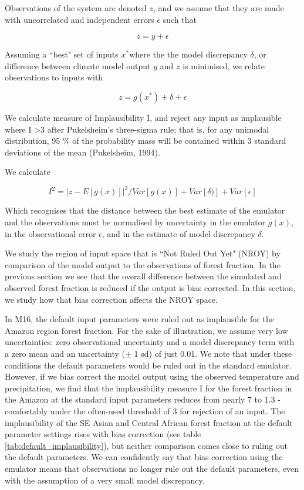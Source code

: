 \documentclass[gmd, manuscript]{copernicus}
\begin{document}
Observations of the system are denoted $z$, and we assume that they are made with uncorrelated and independent errors $\epsilon$  such that

\begin{equation}
z = y+\epsilon
\end{equation}

Assuming a ``best" set of inputs $x^*$where the the model discrepancy $\delta$, or difference between climate model output $y$ and $z$ is minimised, we relate observations to inputs with 

\begin{equation}
z = g(x^*) + \delta + \epsilon 
\end{equation}

We calculate measure of Implausibility I, and reject any input as implausible where I >3 after Pukelsheim's three-sigma rule; that is, for any unimodal distribution, 95 \% of the probability mass will be contained within 3 standard deviations of the mean (Pukelsheim, 1994). 

We calculate

\begin{equation}
I^{2} = {\lvert  z - E[g(x)]\rvert}^{2} /  Var[g(x)] + Var[\delta)] +  Var[\epsilon]
\end{equation}

Which recognises that the distance between the best estimate of the emulator and the observations must be normalised by uncertainty in the emulator $g(x)$, in the observational error $\epsilon$, and in the estimate of model discrepancy $\delta$. 

We study the region of input space that is ``Not Ruled Out Yet" (NROY) by comparison of the model output to the observations of forest fraction. In the previous section we see that the overall difference between the simulated and observed forest fraction is reduced if the output is bias corrected. In this section, we study how that bias correction affects the NROY space.

In M16, the default input parameters were ruled out as implausible for the Amazon region forest fraction. For the sake of illustration, we assume very low uncertainties: zero observational uncertainty and a model discrepancy term with a zero mean and an uncertainty ($\pm$ 1 sd) of just 0.01. We note that under these conditions the default parameters would be ruled out in the standard emulator.  However, if we bias correct the model output using the observed temperature and precipitation, we find that the implausibility measure I for the forest fraction in the Amazon at the standard input parameters reduces from nearly 7 to 1.3 - comfortably under the often-used threshold of 3 for rejection of an input. The implausibility of the SE Asian and Central African forest fraction at the default parameter settings rises with bias correction (see table \ref{tab:default_implausibility}), but neither comparison comes close to ruling out the default parameters. We can confidently say that bias correction using the emulator means that observations no longer rule out the default parameters, even with the assumption of a very small model discrepancy.
\end{document}
